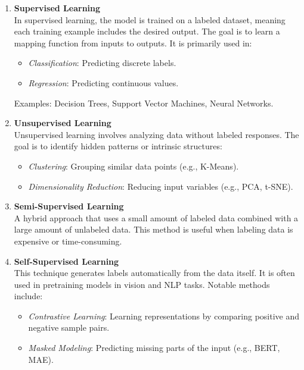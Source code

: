 \documentclass[a4paper,11pt]{article}
\begin{document}
\begin{enumerate}
    \item \textbf{Supervised Learning} \\
    In supervised learning, the model is trained on a labeled dataset, meaning each training example includes the desired output. The goal is to learn a mapping function from inputs to outputs. It is primarily used in:
    \begin{itemize}
        \item \textit{Classification}: Predicting discrete labels.
        \item \textit{Regression}: Predicting continuous values.
    \end{itemize}
    Examples: Decision Trees, Support Vector Machines, Neural Networks.

    \item \textbf{Unsupervised Learning} \\
    Unsupervised learning involves analyzing data without labeled responses. The goal is to identify hidden patterns or intrinsic structures:
    \begin{itemize}
        \item \textit{Clustering}: Grouping similar data points (e.g., K-Means).
        \item \textit{Dimensionality Reduction}: Reducing input variables (e.g., PCA, t-SNE).
    \end{itemize}

    \item \textbf{Semi-Supervised Learning} \\
    A hybrid approach that uses a small amount of labeled data combined with a large amount of unlabeled data. This method is useful when labeling data is expensive or time-consuming.

    \item \textbf{Self-Supervised Learning} \\
    This technique generates labels automatically from the data itself. It is often used in pretraining models in vision and NLP tasks. Notable methods include:
    \begin{itemize}
        \item \textit{Contrastive Learning}: Learning representations by comparing positive and negative sample pairs.
        \item \textit{Masked Modeling}: Predicting missing parts of the input (e.g., BERT, MAE).
    \end{itemize}


\end{enumerate}
\end{document}
